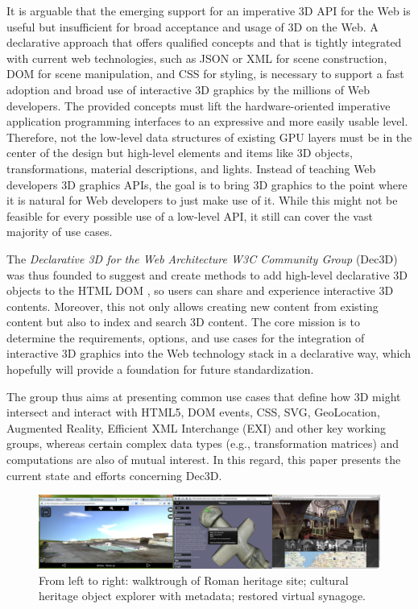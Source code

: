 \documentclass{acmsiggraph}
\begin{document}
It is arguable that the emerging support for an imperative 3D API for the Web is useful but insufficient for broad acceptance and usage of 3D on the Web. A declarative approach that offers qualified concepts and that is tightly integrated with current web technologies, such as JSON or XML for scene construction, DOM for scene manipulation, and CSS for styling, is necessary to support a fast adoption and broad use of interactive 3D graphics by the millions of Web developers. The provided concepts must lift the hardware-oriented imperative application programming interfaces to an expressive and more easily usable level. Therefore, not the low-level data structures of existing GPU layers must be in the center of the design but high-level elements and items like 3D objects, transformations, material descriptions, and lights. Instead of teaching Web developers 3D graphics APIs, the goal is to bring 3D graphics to the point where it is natural for Web developers to just make use of it. While this might not be feasible for every possible use of a low-level API, it still can cover the vast majority of use cases.

The \textit{Declarative 3D for the Web Architecture W3C Community Group} (Dec3D) \cite{Dec3D} was thus founded to suggest and create methods to add high-level declarative 3D objects to the HTML DOM \cite{W3C-DOM}, so users can share and experience interactive 3D contents. Moreover, this not only allows creating new content from existing content but also to index and search 3D content.
The core mission is to determine the requirements, options, and use cases for the integration of interactive 3D graphics into the Web technology stack in a declarative way, which hopefully will provide a foundation for future standardization.

The group thus aims at presenting common use cases that define how 3D might intersect and interact with HTML5, DOM events, CSS, SVG, GeoLocation, Augmented Reality, Efficient XML Interchange (EXI) \cite{EXI} and other key working groups, whereas certain complex data types (e.g., transformation matrices) and computations are also of mutual interest. In this regard, this paper presents the current state and efforts concerning Dec3D.

\begin{figure}%
  \centering
  \includegraphics[width=1.0\textwidth]{images/ch_apps.png}
  \caption{From left to right: walktrough of Roman heritage site; cultural heritage object explorer with metadata; restored virtual synagoge.}
  \label{fig:chApps}
\end{figure}
\end{document}
